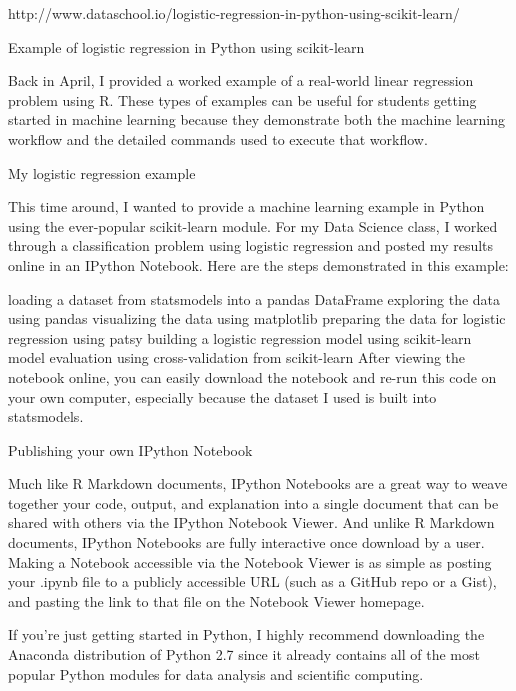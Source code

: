 http://www.dataschool.io/logistic-regression-in-python-using-scikit-learn/

Example of logistic regression in Python using scikit-learn

Back in April, I provided a worked example of a real-world linear regression problem using R. These types of examples can be useful for students getting started in machine learning because they demonstrate both the machine learning workflow and the detailed commands used to execute that workflow.

My logistic regression example

This time around, I wanted to provide a machine learning example in Python using the ever-popular scikit-learn module. For my Data Science class, I worked through a classification problem using logistic regression and posted my results online in an IPython Notebook. Here are the steps demonstrated in this example:

loading a dataset from statsmodels into a pandas DataFrame
exploring the data using pandas
visualizing the data using matplotlib
preparing the data for logistic regression using patsy
building a logistic regression model using scikit-learn
model evaluation using cross-validation from scikit-learn
After viewing the notebook online, you can easily download the notebook and re-run this code on your own computer, especially because the dataset I used is built into statsmodels.

Publishing your own IPython Notebook

Much like R Markdown documents, IPython Notebooks are a great way to weave together your code, output, and explanation into a single document that can be shared with others via the IPython Notebook Viewer. And unlike R Markdown documents, IPython Notebooks are fully interactive once download by a user. Making a Notebook accessible via the Notebook Viewer is as simple as posting your .ipynb file to a publicly accessible URL (such as a GitHub repo or a Gist), and pasting the link to that file on the Notebook Viewer homepage.

If you're just getting started in Python, I highly recommend downloading the Anaconda distribution of Python 2.7 since it already contains all of the most popular Python modules for data analysis and scientific computing.
